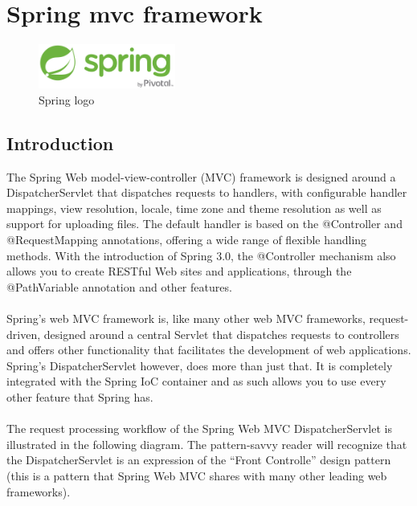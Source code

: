 \documentclass[12pt]{article}
\begin{document}
	\section{Spring mvc framework}
	\begin{figure}[h]
		\centering
		\includegraphics[width=0.4\textwidth]{Spring_logo.png}
		\caption{Spring logo}
	\end{figure}
	\subsection{Introduction}
	The Spring Web model-view-controller (MVC) framework is designed around a \colorbox{mygray}{DispatcherServlet} that dispatches requests to handlers, with configurable handler mappings, view resolution, locale, time zone and theme resolution as well as support for uploading files. The default handler is based on the \colorbox{mygray}{@Controller} and \colorbox{mygray}{@RequestMapping} annotations, offering a wide range of flexible handling methods. With the introduction of Spring 3.0, the \colorbox{mygray}{@Controller} mechanism also allows you to create RESTful Web sites and applications, through the \colorbox{mygray}{@PathVariable} annotation and other features.
	\\
	\\
	Spring’s web MVC framework is, like many other web MVC frameworks, request-driven, designed around a central Servlet that dispatches requests to controllers and offers other functionality that facilitates the development of web applications. Spring’s \colorbox{mygray}{DispatcherServlet} however, does more than just that. It is completely integrated with the Spring IoC container and as such allows you to use every other feature that Spring has.
	\\
	\\
	The request processing workflow of the Spring Web MVC \colorbox{mygray}{DispatcherServlet} is illustrated in the following diagram. The pattern-savvy reader will recognize that the \colorbox{mygray}{DispatcherServlet} is an expression of the ``Front Controlle'' design pattern (this is a pattern that Spring Web MVC shares with many other leading web frameworks).
\end{document}
